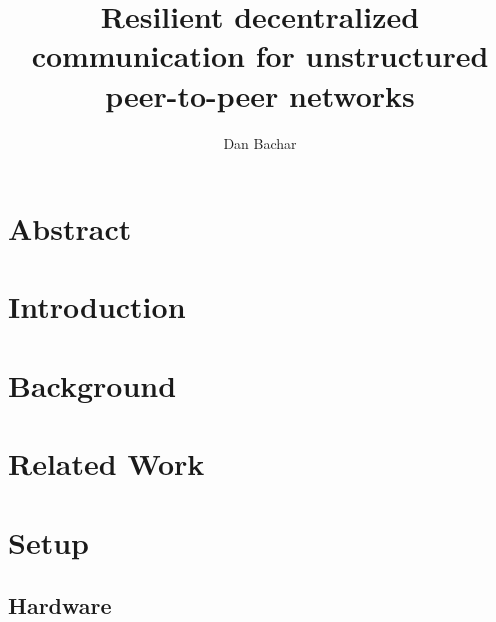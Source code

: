 \documentclass[sigconf,nonacm]{acmart}
\begin{document}
\title{Resilient decentralized communication for unstructured peer-to-peer networks}

\author{Dan Bachar}



\maketitle

\section*{Abstract}

\label{sec:abstract}

\section{Introduction}

\label{sec:introduction}

\section{Background}

\label{sec:background}

\section{Related Work}

\label{sec:related}

\section{Setup}
\subsection{Hardware}

\label{sec:hardware_setup}
\end{document}
